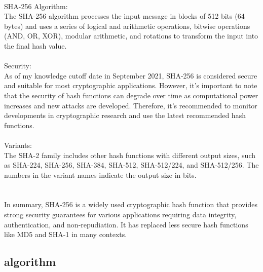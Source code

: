 \documentclass{report}
\begin{document}
 \\
SHA-256 Algorithm:\\
 The SHA-256 algorithm processes the input message in blocks of 512 bits (64 bytes) and uses a series of logical and arithmetic operations, bitwise operations (AND, OR, XOR), modular arithmetic, and rotations to transform the input into the final hash value.\\
 \\
Security:\\
 As of my knowledge cutoff date in September 2021, SHA-256 is considered secure and suitable for most cryptographic applications. However, it's important to note that the security of hash functions can degrade over time as computational power increases and new attacks are developed. Therefore, it's recommended to monitor developments in cryptographic research and use the latest recommended hash functions.\\
 \\
Variants:\\
 The SHA-2 family includes other hash functions with different output sizes, such as SHA-224, SHA-256, SHA-384, SHA-512, SHA-512/224, and SHA-512/256. The numbers in the variant names indicate the output size in bits.\\
 \\
 \\
 In summary, SHA-256 is a widely used cryptographic hash function that provides strong security guarantees for various applications requiring data integrity, authentication, and non-repudiation. It has replaced less secure hash functions like MD5 and SHA-1 in many contexts.

\subsection{algorithm}
\end{document}
